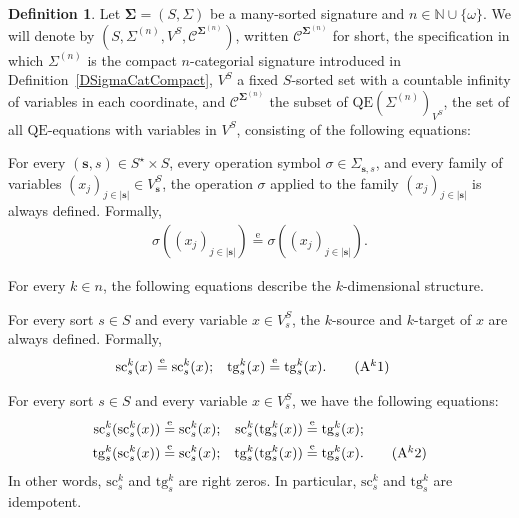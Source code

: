 \documentclass{amsart}
\theoremstyle{plain}
\theoremstyle{definition}
\newtheorem{definition}[theorem]{Definition}
\begin{document}
\begin{definition}\label{DVarCompact}
Let $\mathbf{\Sigma}=(S,\Sigma)$ be a many-sorted signature and $n\in\mathbb{N}\cup\{\omega\}$. We will denote by $(S,\Sigma^{(n)},V^{S},\mathcal{C}^{\mathbf{\Sigma}^{(n)}})$, written $\boldsymbol{\mathcal{C}}^{\mathbf{\Sigma}^{(n)}}$ for short, the specification in which $\Sigma^{(n)}$ is the compact $n$-categorial signature introduced in Definition~\ref{DSigmaCatCompact}, $V^{S}$ a fixed $S$-sorted set with a countable infinity of variables in each coordinate, and $\mathcal{C}^{\mathbf{\Sigma}^{(n)}}$ the subset of $\mathrm{QE}(\Sigma^{(n)})_{V^{S}}$, the set of all $\mathrm{QE}$-equations with variables in $V^{S}$, consisting of the following equations:

For every $(\mathbf{s},s)\in S^{\star}\times S$, every operation symbol $\sigma\in \Sigma_{\mathbf{s},s}$, and every family of variables $(x_{j})_{j\in \lvert\mathbf{s}\rvert}\in V^{S}_{\mathbf{s}}$, the operation $\sigma$ applied to the family $(x_{j})_{j\in \lvert\mathbf{s}\rvert}$ is always defined. Formally,
\allowdisplaybreaks
\begin{align*}
\sigma((x_{j})_{j\in \lvert\mathbf{s}\rvert})\overset{\mathrm{e}}{=}\sigma((x_{j})_{j\in \lvert\mathbf{s}\rvert}).\label{DVarCompactA0}\tag{A0}
\end{align*}

For every $k\in n$, the following equations describe the $k$-dimensional structure.

For every sort $s\in S$ and every variable $x\in V^{S}_{s}$, the $k$-source and $k$-target of $x$ are always defined. Formally,
\allowdisplaybreaks
\begin{align*}
\mathrm{sc}^{k}_{s}(x)&\overset{\mathrm{e}}{=}\mathrm{sc}^{k}_{s}(x);
&
\mathrm{tg}^{k}_{s}(x)&\overset{\mathrm{e}}{=}\mathrm{tg}^{k}_{s}(x).\label{DVarCompactAk1}\tag{A$^{k}$1}
\end{align*}

For every sort $s\in S$ and every variable $x\in V^{S}_{s}$, we have the following equations:
\allowdisplaybreaks
\begin{align*}
\mathrm{sc}^{k}_{s}(\mathrm{sc}^{k}_{s}(x))&\overset{\mathrm{e}}{=}\mathrm{sc}^{k}_{s}(x);
&
\mathrm{sc}^{k}_{s}(\mathrm{tg}^{k}_{s}(x))&\overset{\mathrm{e}}{=}\mathrm{tg}^{k}_{s}(x);\\
\mathrm{tg}^{k}_{s}(\mathrm{sc}^{k}_{s}(x))&\overset{\mathrm{e}}{=}\mathrm{sc}^{k}_{s}(x);
&
\mathrm{tg}^{k}_{s}(\mathrm{tg}^{k}_{s}(x))&\overset{\mathrm{e}}{=}\mathrm{tg}^{k}_{s}(x).\label{DVarCompactAk2}\tag{A$^{k}$2}
\end{align*}
In other words, $\mathrm{sc}^{k}_{s}$ and $\mathrm{tg}^{k}_{s}$ are right zeros. In particular, $\mathrm{sc}^{k}_{s}$ and $\mathrm{tg}^{k}_{s}$ are idempotent.


\end{definition}
\end{document}
